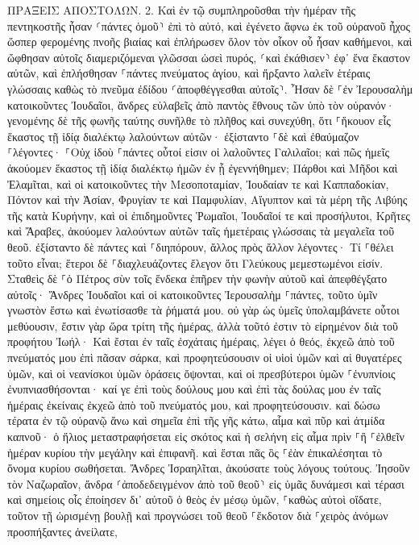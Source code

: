\documentclass[twoside, 9pt]{extreport}
\begin{document}
ΠΡΑΞΕΙΣ ΑΠΟΣΤΟΛΩΝ.
2.
Καὶ ἐν τῷ συμπληροῦσθαι τὴν ἡμέραν τῆς πεντηκοστῆς ἦσαν ⸂πάντες ὁμοῦ⸃ ἐπὶ τὸ αὐτό, 
καὶ ἐγένετο ἄφνω ἐκ τοῦ οὐρανοῦ ἦχος ὥσπερ φερομένης πνοῆς βιαίας καὶ ἐπλήρωσεν ὅλον τὸν οἶκον οὗ ἦσαν καθήμενοι, 
καὶ ὤφθησαν αὐτοῖς διαμεριζόμεναι γλῶσσαι ὡσεὶ πυρός, ⸂καὶ ἐκάθισεν⸃ ἐφ᾽ ἕνα ἕκαστον αὐτῶν, 
καὶ ἐπλήσθησαν ⸀πάντες πνεύματος ἁγίου, καὶ ἤρξαντο λαλεῖν ἑτέραις γλώσσαις καθὼς τὸ πνεῦμα ἐδίδου ⸂ἀποφθέγγεσθαι αὐτοῖς⸃. 
Ἦσαν δὲ ⸀ἐν Ἰερουσαλὴμ κατοικοῦντες Ἰουδαῖοι, ἄνδρες εὐλαβεῖς ἀπὸ παντὸς ἔθνους τῶν ὑπὸ τὸν οὐρανόν· 
γενομένης δὲ τῆς φωνῆς ταύτης συνῆλθε τὸ πλῆθος καὶ συνεχύθη, ὅτι ⸀ἤκουον εἷς ἕκαστος τῇ ἰδίᾳ διαλέκτῳ λαλούντων αὐτῶν· 
ἐξίσταντο ⸀δὲ καὶ ἐθαύμαζον ⸀λέγοντες· ⸀Οὐχ ἰδοὺ ⸀πάντες οὗτοί εἰσιν οἱ λαλοῦντες Γαλιλαῖοι; 
καὶ πῶς ἡμεῖς ἀκούομεν ἕκαστος τῇ ἰδίᾳ διαλέκτῳ ἡμῶν ἐν ᾗ ἐγεννήθημεν; 
Πάρθοι καὶ Μῆδοι καὶ Ἐλαμῖται, καὶ οἱ κατοικοῦντες τὴν Μεσοποταμίαν, Ἰουδαίαν τε καὶ Καππαδοκίαν, Πόντον καὶ τὴν Ἀσίαν, 
Φρυγίαν τε καὶ Παμφυλίαν, Αἴγυπτον καὶ τὰ μέρη τῆς Λιβύης τῆς κατὰ Κυρήνην, καὶ οἱ ἐπιδημοῦντες Ῥωμαῖοι, 
Ἰουδαῖοί τε καὶ προσήλυτοι, Κρῆτες καὶ Ἄραβες, ἀκούομεν λαλούντων αὐτῶν ταῖς ἡμετέραις γλώσσαις τὰ μεγαλεῖα τοῦ θεοῦ. 
ἐξίσταντο δὲ πάντες καὶ ⸀διηπόρουν, ἄλλος πρὸς ἄλλον λέγοντες· Τί ⸀θέλει τοῦτο εἶναι; 
ἕτεροι δὲ ⸀διαχλευάζοντες ἔλεγον ὅτι Γλεύκους μεμεστωμένοι εἰσίν. 
Σταθεὶς δὲ ⸀ὁ Πέτρος σὺν τοῖς ἕνδεκα ἐπῆρεν τὴν φωνὴν αὐτοῦ καὶ ἀπεφθέγξατο αὐτοῖς· Ἄνδρες Ἰουδαῖοι καὶ οἱ κατοικοῦντες Ἰερουσαλὴμ ⸀πάντες, τοῦτο ὑμῖν γνωστὸν ἔστω καὶ ἐνωτίσασθε τὰ ῥήματά μου. 
οὐ γὰρ ὡς ὑμεῖς ὑπολαμβάνετε οὗτοι μεθύουσιν, ἔστιν γὰρ ὥρα τρίτη τῆς ἡμέρας, 
ἀλλὰ τοῦτό ἐστιν τὸ εἰρημένον διὰ τοῦ προφήτου Ἰωήλ· 
Καὶ ἔσται ἐν ταῖς ἐσχάταις ἡμέραις, λέγει ὁ θεός, ἐκχεῶ ἀπὸ τοῦ πνεύματός μου ἐπὶ πᾶσαν σάρκα, καὶ προφητεύσουσιν οἱ υἱοὶ ὑμῶν καὶ αἱ θυγατέρες ὑμῶν, καὶ οἱ νεανίσκοι ὑμῶν ὁράσεις ὄψονται, καὶ οἱ πρεσβύτεροι ὑμῶν ⸀ἐνυπνίοις ἐνυπνιασθήσονται· 
καί γε ἐπὶ τοὺς δούλους μου καὶ ἐπὶ τὰς δούλας μου ἐν ταῖς ἡμέραις ἐκείναις ἐκχεῶ ἀπὸ τοῦ πνεύματός μου, καὶ προφητεύσουσιν. 
καὶ δώσω τέρατα ἐν τῷ οὐρανῷ ἄνω καὶ σημεῖα ἐπὶ τῆς γῆς κάτω, αἷμα καὶ πῦρ καὶ ἀτμίδα καπνοῦ· 
ὁ ἥλιος μεταστραφήσεται εἰς σκότος καὶ ἡ σελήνη εἰς αἷμα πρὶν ⸀ἢ ⸀ἐλθεῖν ἡμέραν κυρίου τὴν μεγάλην καὶ ἐπιφανῆ. 
καὶ ἔσται πᾶς ὃς ⸀ἐὰν ἐπικαλέσηται τὸ ὄνομα κυρίου σωθήσεται. 
Ἄνδρες Ἰσραηλῖται, ἀκούσατε τοὺς λόγους τούτους. Ἰησοῦν τὸν Ναζωραῖον, ἄνδρα ⸂ἀποδεδειγμένον ἀπὸ τοῦ θεοῦ⸃ εἰς ὑμᾶς δυνάμεσι καὶ τέρασι καὶ σημείοις οἷς ἐποίησεν δι᾽ αὐτοῦ ὁ θεὸς ἐν μέσῳ ὑμῶν, ⸀καθὼς αὐτοὶ οἴδατε, 
τοῦτον τῇ ὡρισμένῃ βουλῇ καὶ προγνώσει τοῦ θεοῦ ⸀ἔκδοτον διὰ ⸀χειρὸς ἀνόμων προσπήξαντες ἀνείλατε, 
\end{document}
